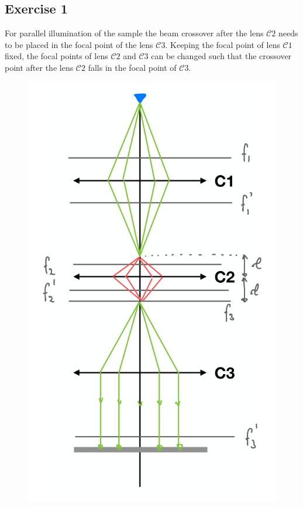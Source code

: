 \documentclass[a4paper]{scrartcl}
\begin{document}
\subsection*{Exercise 1}

For parallel illumination of the sample the beam crossover after the lens $\mathcal{C}2$ needs to be placed in the focal point of the lens $\mathcal{C}3$.
Keeping the focal point of lens $\mathcal{C}1$ fixed, the focal points of lens $\mathcal{C}2$ and $\mathcal{C}3$ can be changed such that the crossover point after the lens $\mathcal{C}2$ falls in the focal point of $\mathcal{C}3$.

\begin{figure}
  \centering
  \includegraphics[width=.5\textwidth, keepaspectratio]{fig.png}
\end{figure}
\end{document}
